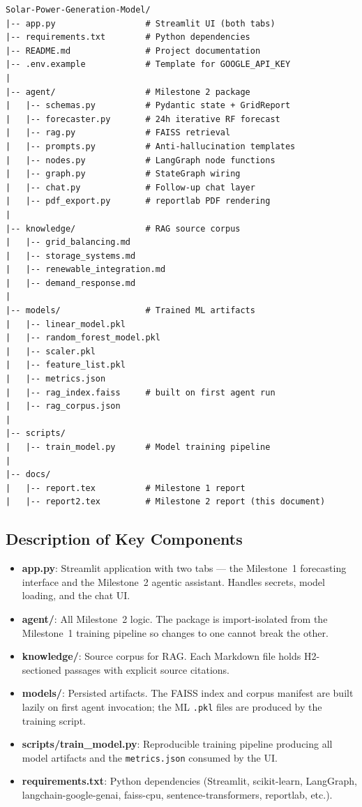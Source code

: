 \documentclass[journal,onecolumn,11pt]{IEEEtran}
\begin{document}
\begin{lstlisting}[caption={Project repository layout.}]
Solar-Power-Generation-Model/
|-- app.py                  # Streamlit UI (both tabs)
|-- requirements.txt        # Python dependencies
|-- README.md               # Project documentation
|-- .env.example            # Template for GOOGLE_API_KEY
|
|-- agent/                  # Milestone 2 package
|   |-- schemas.py          # Pydantic state + GridReport
|   |-- forecaster.py       # 24h iterative RF forecast
|   |-- rag.py              # FAISS retrieval
|   |-- prompts.py          # Anti-hallucination templates
|   |-- nodes.py            # LangGraph node functions
|   |-- graph.py            # StateGraph wiring
|   |-- chat.py             # Follow-up chat layer
|   |-- pdf_export.py       # reportlab PDF rendering
|
|-- knowledge/              # RAG source corpus
|   |-- grid_balancing.md
|   |-- storage_systems.md
|   |-- renewable_integration.md
|   |-- demand_response.md
|
|-- models/                 # Trained ML artifacts
|   |-- linear_model.pkl
|   |-- random_forest_model.pkl
|   |-- scaler.pkl
|   |-- feature_list.pkl
|   |-- metrics.json
|   |-- rag_index.faiss     # built on first agent run
|   |-- rag_corpus.json
|
|-- scripts/
|   |-- train_model.py      # Model training pipeline
|
|-- docs/
|   |-- report.tex          # Milestone 1 report
|   |-- report2.tex         # Milestone 2 report (this document)
\end{lstlisting}

\subsection{Description of Key Components}
\begin{itemize}
  \item \textbf{app.py}: Streamlit application with two tabs --- the Milestone~1 forecasting interface and the Milestone~2 agentic assistant. Handles secrets, model loading, and the chat UI.
  \item \textbf{agent/}: All Milestone~2 logic. The package is import-isolated from the Milestone~1 training pipeline so changes to one cannot break the other.
  \item \textbf{knowledge/}: Source corpus for RAG. Each Markdown file holds H2-sectioned passages with explicit source citations.
  \item \textbf{models/}: Persisted artifacts. The FAISS index and corpus manifest are built lazily on first agent invocation; the ML \texttt{.pkl} files are produced by the training script.
  \item \textbf{scripts/train\_model.py}: Reproducible training pipeline producing all model artifacts and the \texttt{metrics.json} consumed by the UI.
  \item \textbf{requirements.txt}: Python dependencies (Streamlit, scikit-learn, LangGraph, langchain-google-genai, faiss-cpu, sentence-transformers, reportlab, etc.).
\end{itemize}
\end{document}
